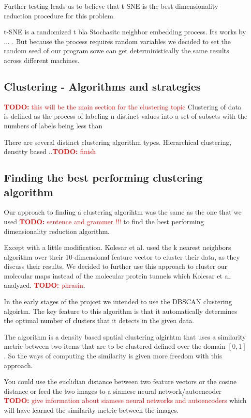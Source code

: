 \documentclass[journal]{vgtc}       %
\newcommand{\todo}[1]{\textcolor{red}{\textbf{TODO:} #1}}
\begin{document}
Further testing leads us to believe that t-SNE is the best dimensionality reduction procedure for this problem.

t-SNE is a randomized t bla Stochasitc neighbor embedding process. Its works by ... . But because the process requires random variables we decided to set the random seed of our program sowe can get deterministically the same results across different machines.

\subsection{Clustering - Algorithms and strategies }
\todo{this will be the main section for the clustering topic }
Clustering of data is defined as the process of labeling n distinct values into a set of subsets with the numbers of labels being less than 

There are several distinct clustering algorithm types. Hierarchical clustering, densitty based ..\todo{finish}


\subsection{Finding the best performing clustering algorithm}
Our approach to finding a clustering algorihtm was the same as the one that we used \todo{sentence and grammer  !!! } to find the best performing dimensionality reduction algorithm.

Except with a little modification. Kolesar et al. \cite{kolesar} used the k nearest neighbors algorithm over their 10-dimensional feature vector to cluster their data, as they discuss their results. We decided to further use this approach to cluster our molecular maps instead of the molecular protein tunnels which Kolesar et al. analyzed. \todo{phrasin}.


In the early stages of the projcet we intended to use the DBSCAN clustering algoirtm. 
The key feature to this algorithm is that it automatically determines the optimal number of clusters that it detects in the given data. 

The algorithm is a density based spatial clustering algirhtm that uses a similarity metric between two items that are to be  clustered defined over the domain \([0,1]\). So the ways of computing the similarity is given more freedom with this approach.


You could use the euclidian distance between two feature vectors or the cosine distance or feed the two images to a siamese neural network/autoencoder \todo{give information about siamese neural networks and autoencoders} which will have learned the similarity metric between the images.
\end{document}
